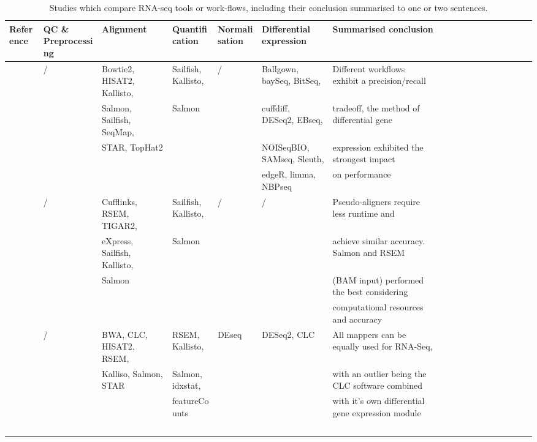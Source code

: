 \begin{landscape}
	\pagestyle{empty}
\begin{table}[h]
	\tiny
    \centering
    \captionsetup{font=scriptsize}
    \caption{Studies which compare RNA-seq tools or work-flows, including their conclusion summarised to one or two sentences.}
    \label{tab:rnaseq_review}
    \begin{adjustwidth}{-1cm}{}
    \begin{tabular}{llllllllllllllllll}
		\toprule
        \textbf{Reference} & \textbf{QC \& Preprocessing} & \textbf{Alignment} & \textbf{Quantification} & \textbf{Normalisation} & \textbf{Differential expression} & \textbf{Summarised conclusion}  \\ \midrule
        \cite{williams2017empirical} & / &  Bowtie2, HISAT2, Kallisto, & Sailfish, Kallisto,  & / & Ballgown, baySeq, BitSeq,  & Different workflows exhibit a precision/recall   \\ 
        ~ & ~ &  Salmon, Sailfish, SeqMap,  & Salmon & ~ & cuffdiff, DESeq2, EBseq,  & tradeoff,  the method of differential gene  \\ 
        ~ & ~ & STAR, TopHat2 & ~ & ~ & NOISeqBIO, SAMseq, Sleuth,  &  expression exhibited the strongest impact  \\ 
        ~ & ~ & ~ & ~ & ~ & edgeR, limma, NBPseq &  on performance  \\ \hline
        \cite{Zhang2017} & / & Cufflinks, RSEM, TIGAR2,  & Sailfish, Kallisto,  & / & / & Pseudo-aligners require less runtime and   \\ 
        ~ & ~ & eXpress, Sailfish, Kallisto,  & Salmon & ~ & ~ & achieve similar accuracy. Salmon and RSEM  \\
        ~ & ~ & Salmon & ~ & ~ & ~ &  (BAM input) performed the best considering  \\ 
        ~ & ~ & ~ & ~ & ~ & ~ &  computational resources and accuracy  \\ \hline
        \cite{Schaarschmidt2020} & / & BWA, CLC, HISAT2, RSEM,   & RSEM, Kallisto,  &  DEseq & DESeq2, CLC & All mappers can be equally used for RNA-Seq,    \\ 
        ~ & ~ & Kalliso, Salmon, STAR & Salmon,  idxstat, & ~ & ~ & with an outlier being the CLC software combined   \\ 
        ~ & ~ & ~ & featureCounts & ~ & ~ & with it's own differential gene expression module  \\ 
        ~ & ~ & ~ & ~ & ~ & ~ &   \\ \hline

\end{tabular}
\end{adjustwidth}
\end{table}
\end{landscape}
